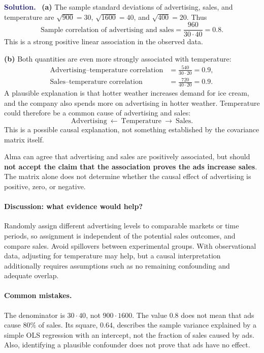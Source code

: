 \documentclass[11pt]{article}
\newenvironment{answer}{%
    \par\medskip\noindent\textcolor{MidnightBlue}{\textbf{Solution.}}\ }
    {\par\medskip}
\begin{document}
\begin{answer}
\textbf{(a)} The sample standard deviations of advertising, sales, and
temperature are $\sqrt{900}=30$, $\sqrt{1600}=40$, and
$\sqrt{400}=20$. Thus
\[
  \boxed{\text{Sample correlation of advertising and sales}
    =\frac{960}{30\cdot40}=0.8.}
\]
This is a strong positive linear association in the observed data.

\textbf{(b)} Both quantities are even more strongly associated with
temperature:
\begin{align*}
  \text{Advertising--temperature correlation}
    &=\frac{540}{30\cdot20}=0.9,\\
  \text{Sales--temperature correlation}
    &=\frac{720}{40\cdot20}=0.9.
\end{align*}
A plausible explanation is that hotter weather increases demand for ice
cream, and the company also spends more on advertising in hotter weather.
Temperature could therefore be a common cause of advertising and sales:
\[
  \text{Advertising}\ \longleftarrow\ \text{Temperature}\
  \longrightarrow\ \text{Sales}.
\]
This is a possible causal explanation, not something established by the
covariance matrix itself.

Alma can agree that advertising and sales are positively associated, but
should \textbf{not accept the claim that the association proves the ads
increase sales}. The matrix alone does not determine whether the causal
effect of advertising is positive, zero, or negative.

\paragraph{Discussion: what evidence would help?}
Randomly assign different advertising levels to comparable markets or
time periods, so assignment is independent of the potential sales outcomes,
and compare sales. Avoid spillovers between experimental groups.
With observational data, adjusting for temperature may help, but a causal
interpretation additionally requires assumptions such as no remaining
confounding and adequate overlap.

\paragraph{Common mistakes.}
The denominator is $30\cdot40$, not $900\cdot1600$.
The value $0.8$ does not mean that ads cause $80\%$ of sales.
Its square, $0.64$, describes the sample variance explained by a simple
OLS regression with an intercept, not the fraction of sales caused by ads.
Also, identifying a plausible confounder does not prove that ads have no effect.
\end{answer}
\end{document}
